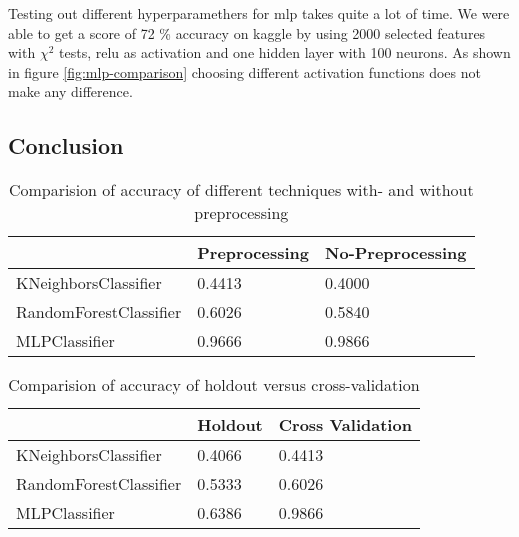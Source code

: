 Testing out different hyperparamethers for mlp takes quite a lot of time. We were able to get a score of 72 \% accuracy on kaggle by using 2000 selected features with ${\chi}^2$ tests, relu as activation and one hidden layer with 100 neurons. As shown in figure \ref{fig:mlp-comparison} choosing different activation functions does not make any difference.



\subsection{Conclusion}

\begin{table}[H]
\begin{center}
\begin{tabular}{|l|l|l|}
\hline
                       & Preprocessing & No-Preprocessing \\ \hline
KNeighborsClassifier   & 0.4413        & 0.4000           \\ \hline
RandomForestClassifier & 0.6026        & 0.5840           \\ \hline
MLPClassifier          & 0.9666        & 0.9866           \\ \hline
\end{tabular}
\caption{Comparision of accuracy of different techniques with- and without preprocessing}
\end{center}
\end{table}

\begin{table}[H]
\begin{center}
\begin{tabular}{|l|l|l|}
\hline
                       & Holdout & Cross Validation \\ \hline
KNeighborsClassifier   & 0.4066  & 0.4413           \\ \hline
RandomForestClassifier & 0.5333  & 0.6026           \\ \hline
MLPClassifier          & 0.6386  & 0.9866           \\ \hline
\end{tabular}
\caption{Comparision of accuracy of holdout versus cross-validation}
\end{center}
\end{table}

